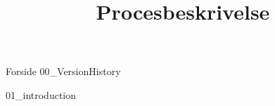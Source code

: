\documentclass[a4paper,openany]{memoir}
\title{Procesbeskrivelse}
\begin{document}
	{Forside}  \newpage
	\tableofcontents\thispagestyle{fancy}
	{00_VersionHistory}  \newpage

	{01_introduction}  \newpage

	 {}
	\printbibliography
\end{document}
